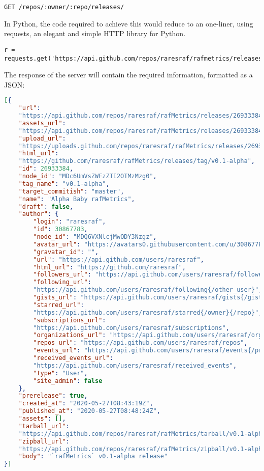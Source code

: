 \begin{verbatim}
GET /repos/:owner/:repo/releases/
\end{verbatim}

In Python, the code required to achieve this would reduce to an one-liner, using requests,  an elegant and simple HTTP library for Python.

\begin{verbatim}
r = requests.get('https://api.github.com/repos/raresraf/rafmetrics/releases')
\end{verbatim}

The response of the server will contain the required information, formatted as a JSON:
\begin{lstlisting}[language=json,firstnumber=1]
[{
    "url":
    "https://api.github.com/repos/raresraf/rafMetrics/releases/26933384",
    "assets_url":
    "https://api.github.com/repos/raresraf/rafMetrics/releases/26933384/assets",
    "upload_url":
    "https://uploads.github.com/repos/raresraf/rafMetrics/releases/26933384/assets{?name,label}",
    "html_url":
    "https://github.com/raresraf/rafMetrics/releases/tag/v0.1-alpha",
    "id": 26933384,
    "node_id": "MDc6UmVsZWFzZTI2OTMzMzg0",
    "tag_name": "v0.1-alpha",
    "target_commitish": "master",
    "name": "Alpha Baby rafMetrics",
    "draft": false,
    "author": {
        "login": "raresraf",
        "id": 30867783,
        "node_id": "MDQ6VXNlcjMwODY3Nzgz",
        "avatar_url": "https://avatars0.githubusercontent.com/u/30867783?v=4",
        "gravatar_id": "",
        "url": "https://api.github.com/users/raresraf",
        "html_url": "https://github.com/raresraf",
        "followers_url": "https://api.github.com/users/raresraf/followers",
        "following_url":
        "https://api.github.com/users/raresraf/following{/other_user}",
        "gists_url": "https://api.github.com/users/raresraf/gists{/gist_id}",
        "starred_url":
        "https://api.github.com/users/raresraf/starred{/owner}{/repo}",
        "subscriptions_url":
        "https://api.github.com/users/raresraf/subscriptions",
        "organizations_url": "https://api.github.com/users/raresraf/orgs",
        "repos_url": "https://api.github.com/users/raresraf/repos",
        "events_url": "https://api.github.com/users/raresraf/events{/privacy}",
        "received_events_url":
        "https://api.github.com/users/raresraf/received_events",
        "type": "User",
        "site_admin": false
    },
    "prerelease": true,
    "created_at": "2020-05-27T08:43:19Z",
    "published_at": "2020-05-27T08:48:24Z",
    "assets": [],
    "tarball_url":
    "https://api.github.com/repos/raresraf/rafMetrics/tarball/v0.1-alpha",
    "zipball_url":
    "https://api.github.com/repos/raresraf/rafMetrics/zipball/v0.1-alpha",
    "body": "`rafMetrics` v0.1-alpha release"
}]
\end{lstlisting}

